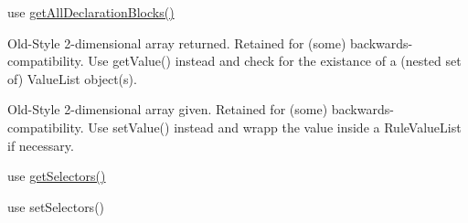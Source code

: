 \begin{DoxyRefList}
\item[Member \mbox{\hyperlink{class_dompdf_1_1_font_metrics_a62cecbb100971066b172a33d66dfc55b}{Dompdf\textbackslash{}Font\+Metrics\+::save\+\_\+font\+\_\+families}} ()]\label{deprecated__deprecated000036}%
%
  
\item[Member \mbox{\hyperlink{class_sabberworm_1_1_c_s_s_1_1_c_s_s_list_1_1_document_ac5c5194faf2a24943621892389eae2f8}{Sabberworm\textbackslash{}CSS\textbackslash{}CSSList\textbackslash{}Document\+::get\+All\+Selectors}} ()]\label{deprecated__deprecated000040}%
%
use \mbox{\hyperlink{class_sabberworm_1_1_c_s_s_1_1_c_s_s_list_1_1_document_a1edddd2faf3c8ab38b7e0a2d303b9d24}{get\+All\+Declaration\+Blocks()}}  
\item[Member \mbox{\hyperlink{class_sabberworm_1_1_c_s_s_1_1_rule_1_1_rule_ad4eb5c44e12d2730293e4ca90ed57a9a}{Sabberworm\textbackslash{}CSS\textbackslash{}Rule\textbackslash{}Rule\+::get\+Values}} ()]\label{deprecated__deprecated000042}%
%
Old-\/\+Style 2-\/dimensional array returned. Retained for (some) backwards-\/compatibility. Use get\+Value() instead and check for the existance of a (nested set of) Value\+List object(s).  
\item[Member \mbox{\hyperlink{class_sabberworm_1_1_c_s_s_1_1_rule_1_1_rule_ae885de84ee1f6dd4ab1027ce44a1be5c}{Sabberworm\textbackslash{}CSS\textbackslash{}Rule\textbackslash{}Rule\+::set\+Values}} (\$a\+Space\+Separated\+Values)]\label{deprecated__deprecated000041}%
%
Old-\/\+Style 2-\/dimensional array given. Retained for (some) backwards-\/compatibility. Use set\+Value() instead and wrapp the value inside a Rule\+Value\+List if necessary.  
\item[Member \mbox{\hyperlink{class_sabberworm_1_1_c_s_s_1_1_rule_set_1_1_declaration_block_ab85a1d4ad64ebda2147791f6e8c4d35a}{Sabberworm\textbackslash{}CSS\textbackslash{}Rule\+Set\textbackslash{}Declaration\+Block\+::get\+Selector}} ()]\label{deprecated__deprecated000043}%
%
use \mbox{\hyperlink{class_sabberworm_1_1_c_s_s_1_1_rule_set_1_1_declaration_block_a999712cb450fb0a2a51745ab7fd50977}{get\+Selectors()}}  
\item[Member \mbox{\hyperlink{class_sabberworm_1_1_c_s_s_1_1_rule_set_1_1_declaration_block_a80c3e48792fa17f21d850753c1c18e51}{Sabberworm\textbackslash{}CSS\textbackslash{}Rule\+Set\textbackslash{}Declaration\+Block\+::set\+Selector}} (\$m\+Selector)]\label{deprecated__deprecated000044}%
%
use set\+Selectors() 
\end{DoxyRefList}